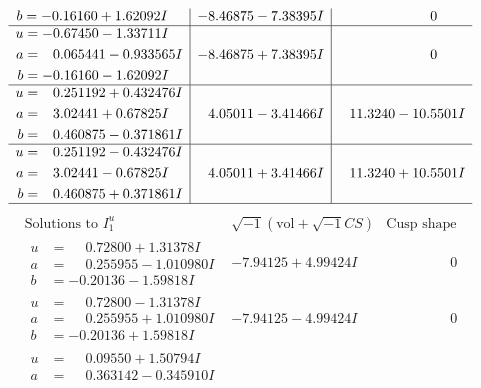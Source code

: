 \documentclass[1p]{elsarticle_modified}
\theoremstyle{definition}
\newcommand{\I}{\sqrt{-1}}
\begin{document}
$$\begin{array}{c|c|c}
\begin{aligned}
b &= -0.16160 + 1.62092 I\end{aligned}
 & -8.46875 - 7.38395 I & \phantom{-0.000000 } 0 \\ \hline\begin{aligned}
u &= -0.67450 - 1.33711 I \\
a &= \phantom{-}0.065441 - 0.933565 I \\
b &= -0.16160 - 1.62092 I\end{aligned}
 & -8.46875 + 7.38395 I & \phantom{-0.000000 } 0 \\ \hline\begin{aligned}
u &= \phantom{-}0.251192 + 0.432476 I \\
a &= \phantom{-}3.02441 + 0.67825 I \\
b &= \phantom{-}0.460875 - 0.371861 I\end{aligned}
 & \phantom{-}4.05011 - 3.41466 I & \phantom{-}11.3240 - 10.5501 I \\ \hline\begin{aligned}
u &= \phantom{-}0.251192 - 0.432476 I \\
a &= \phantom{-}3.02441 - 0.67825 I \\
b &= \phantom{-}0.460875 + 0.371861 I\end{aligned}
 & \phantom{-}4.05011 + 3.41466 I & \phantom{-}11.3240 + 10.5501 I\\
 \hline 
 \end{array}$$\newpage$$\begin{array}{c|c|c}  
\text{Solutions to }I^u_{1}& \I (\text{vol} + \sqrt{-1}CS) & \text{Cusp shape}\\
 \hline 
\begin{aligned}
u &= \phantom{-}0.72800 + 1.31378 I \\
a &= \phantom{-}0.255955 - 1.010980 I \\
b &= -0.20136 - 1.59818 I\end{aligned}
 & -7.94125 + 4.99424 I & \phantom{-0.000000 } 0 \\ \hline\begin{aligned}
u &= \phantom{-}0.72800 - 1.31378 I \\
a &= \phantom{-}0.255955 + 1.010980 I \\
b &= -0.20136 + 1.59818 I\end{aligned}
 & -7.94125 - 4.99424 I & \phantom{-0.000000 } 0 \\ \hline\begin{aligned}
u &= \phantom{-}0.09550 + 1.50794 I \\
a &= \phantom{-}0.363142 - 0.345910 I \\

\end{aligned}
\end{array}$$
\end{document}
